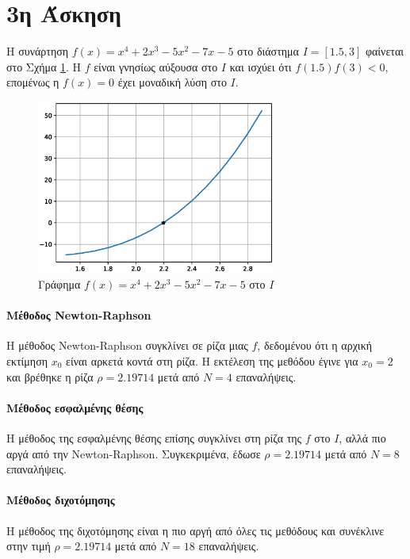 \documentclass[assignment2.tex]{subfiles}
\begin{document}
\section*{3η Άσκηση}
Η συνάρτηση $f(x)=x^4+2x^3-5x^2-7x-5$ στο διάστημα $I=[1.5, 3]$ φαίνεται στο Σχήμα \ref{fig:f3}. Η $f$ είναι γνησίως αύξουσα στο $I$ και ισχύει ότι $f(1.5)f(3)<0$, επομένως η $f(x)=0$ έχει μοναδική λύση στο $I$.
\begin{figure}[hp]
	\includegraphics[width=0.7\textwidth]{f3.eps}
	\centering
	\caption{Γράφημα $f(x)=x^4+2x^3-5x^2-7x-5$ στο $I$}
	\label{fig:f3}
\end{figure}

\paragraph{Μέθοδος \textlatin{Newton-Raphson}}
Η μέθοδος \textlatin{Newton-Raphson} συγκλίνει σε ρίζα μιας $f$, δεδομένου ότι η αρχική εκτίμηση $x_0$ είναι αρκετά κοντά στη ρίζα. Η εκτέλεση της μεθόδου έγινε για $x_0=2$ και βρέθηκε η ρίζα $\rho= 2.19714$ μετά από $N=4$ επαναλήψεις.

\paragraph{Μέθοδος εσφαλμένης θέσης}
Η μέθοδος της εσφαλμένης θέσης επίσης συγκλίνει στη ρίζα της $f$ στο $Ι$, αλλά πιο αργά από την \textlatin{Newton-Raphson}. Συγκεκριμένα, έδωσε $\rho=2.19714$ μετά από $N=8$ επαναλήψεις.

\paragraph{Μέθοδος διχοτόμησης}
Η μέθοδος της διχοτόμησης είναι η πιο αργή από όλες τις μεθόδους και συνέκλινε στην τιμή $\rho=2.19714$ μετά από $N=18$ επαναλήψεις.
\end{document}

